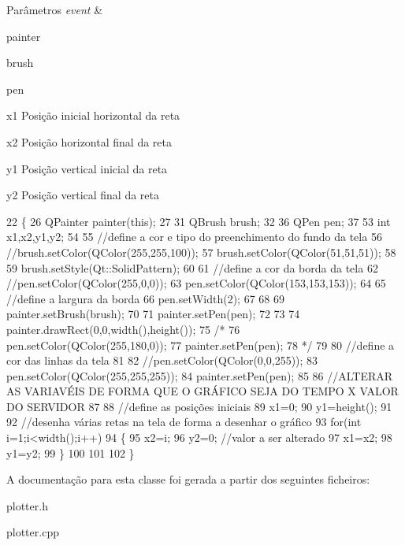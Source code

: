 \begin{DoxyParams}{Parâmetros}
{\em event} & \\
\hline
\end{DoxyParams}
painter

brush

pen

x1 Posição inicial horizontal da reta

x2 Posição horizontal final da reta

y1 Posição vertical inicial da reta

y2 Posição vertical final da reta
\begin{DoxyCode}
22 \{
26     QPainter painter(\textcolor{keyword}{this});
27 
31     QBrush brush;
32 
36     QPen pen;
37 
53     \textcolor{keywordtype}{int} x1,x2,y1,y2;
54 
55     \textcolor{comment}{//define a cor e tipo do preenchimento do fundo da tela}
56     \textcolor{comment}{//brush.setColor(QColor(255,255,100));}
57     brush.setColor(QColor(51,51,51));
58 
59     brush.setStyle(Qt::SolidPattern);
60 
61     \textcolor{comment}{//define a cor da borda da tela}
62     \textcolor{comment}{//pen.setColor(QColor(255,0,0));}
63     pen.setColor(QColor(153,153,153));
64 
65     \textcolor{comment}{//define a largura da borda}
66     pen.setWidth(2);
67 
68 
69     painter.setBrush(brush);
70 
71     painter.setPen(pen);
72 
73 
74     painter.drawRect(0,0,width(),height());
75     \textcolor{comment}{/*}
76 \textcolor{comment}{    pen.setColor(QColor(255,180,0));}
77 \textcolor{comment}{    painter.setPen(pen);}
78 \textcolor{comment}{    */}
79 
80     \textcolor{comment}{//define a cor das linhas da tela}
81 
82     \textcolor{comment}{//pen.setColor(QColor(0,0,255));}
83     pen.setColor(QColor(255,255,255));
84     painter.setPen(pen);
85 
86     \textcolor{comment}{//ALTERAR AS VARIAVÉIS DE FORMA QUE O GRÁFICO SEJA DO TEMPO X VALOR DO SERVIDOR}
87 
88     \textcolor{comment}{//define as posições iniciais}
89     x1=0;
90     y1=height();
91 
92     \textcolor{comment}{//desenha várias retas na tela de forma a desenhar o gráfico}
93     \textcolor{keywordflow}{for}(\textcolor{keywordtype}{int} i=1;i<width();i++)
94     \{
95         x2=i;
96         y2=0; \textcolor{comment}{//valor a ser alterado}
97         x1=x2;
98         y1=y2;
99     \}
100 
101 
102 \}
\end{DoxyCode}


A documentação para esta classe foi gerada a partir dos seguintes ficheiros\+:\begin{DoxyCompactItemize}
\item 
plotter.\+h\item 
plotter.\+cpp\end{DoxyCompactItemize}
